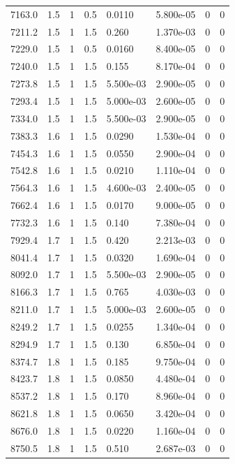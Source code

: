 \documentclass[preview]{standalone}
\begin{document}
{{{{\begin{tabular}{L{1.2cm}C{1.2cm} C{0.3cm}C{0.5cm} C{1.4cm}C{1.4cm} C{1.4cm}C{1.4cm}}
  7163.0  &   1.5  & 1     & 0.5 &  0.0110  & 5.800e-05  & 0 &  0   \\ 
  7211.2  &   1.5  & 1     & 1.5 &  0.260  & 1.370e-03  & 0 &  0   \\ 
  7229.0  &   1.5  & 1     & 0.5 &  0.0160  & 8.400e-05  & 0 &  0   \\ 
  7240.0  &   1.5  & 1     & 1.5 &  0.155  & 8.170e-04  & 0 &  0   \\ 
  7273.8  &   1.5  & 1     & 1.5 &  5.500e-03  & 2.900e-05  & 0 &  0   \\ 
  7293.4  &   1.5  & 1     & 1.5 &  5.000e-03  & 2.600e-05  & 0 &  0   \\ 
  7334.0  &   1.5  & 1     & 1.5 &  5.500e-03  & 2.900e-05  & 0 &  0   \\ 
  7383.3  &   1.6  & 1     & 1.5 &  0.0290  & 1.530e-04  & 0 &  0   \\ 
  7454.3  &   1.6  & 1     & 1.5 &  0.0550  & 2.900e-04  & 0 &  0   \\ 
  7542.8  &   1.6  & 1     & 1.5 &  0.0210  & 1.110e-04  & 0 &  0   \\ 
  7564.3  &   1.6  & 1     & 1.5 &  4.600e-03  & 2.400e-05  & 0 &  0   \\ 
  7662.4  &   1.6  & 1     & 1.5 &  0.0170  & 9.000e-05  & 0 &  0   \\ 
  7732.3  &   1.6  & 1     & 1.5 &  0.140  & 7.380e-04  & 0 &  0   \\ 
  7929.4  &   1.7  & 1     & 1.5 &  0.420  & 2.213e-03  & 0 &  0   \\ 
  8041.4  &   1.7  & 1     & 1.5 &  0.0320  & 1.690e-04  & 0 &  0   \\ 
  8092.0  &   1.7  & 1     & 1.5 &  5.500e-03  & 2.900e-05  & 0 &  0   \\ 
  8166.3  &   1.7  & 1     & 1.5 &  0.765  & 4.030e-03  & 0 &  0   \\ 
  8211.0  &   1.7  & 1     & 1.5 &  5.000e-03  & 2.600e-05  & 0 &  0   \\ 
  8249.2  &   1.7  & 1     & 1.5 &  0.0255  & 1.340e-04  & 0 &  0   \\ 
  8294.9  &   1.7  & 1     & 1.5 &  0.130  & 6.850e-04  & 0 &  0   \\ 
  8374.7  &   1.8  & 1     & 1.5 &  0.185  & 9.750e-04  & 0 &  0   \\ 
  8423.7  &   1.8  & 1     & 1.5 &  0.0850  & 4.480e-04  & 0 &  0   \\ 
  8537.2  &   1.8  & 1     & 1.5 &  0.170  & 8.960e-04  & 0 &  0   \\ 
  8621.8  &   1.8  & 1     & 1.5 &  0.0650  & 3.420e-04  & 0 &  0   \\ 
  8676.0  &   1.8  & 1     & 1.5 &  0.0220  & 1.160e-04  & 0 &  0   \\ 
  8750.5  &   1.8  & 1     & 1.5 &  0.510  & 2.687e-03  & 0 &  0   \\ 
\hline 
\end{tabular} 

}}}}
\end{document}
